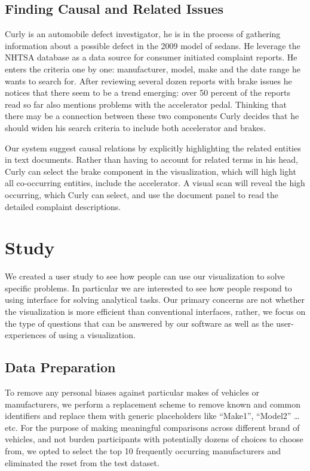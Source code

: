 \subsection{Finding Causal and Related Issues}
Curly is an automobile defect investigator, he is in the process of gathering
information about a possible defect in the 2009 model of sedans. He leverage the
NHTSA database as a data source for consumer initiated complaint reports. He
enters the criteria one by one: manufacturer, model, make and the date range he
wants to search for. After reviewing several dozen reports with brake issues he
notices that there seem to be a trend emerging: over 50 percent of the reports
read so far also mentions problems with the accelerator pedal. Thinking that
there may be a connection between these two components Curly decides that he
should widen his search criteria to include both accelerator and brakes.

Our system suggest causal relations by explicitly highlighting the related
entities in text documents. Rather than having to account for related terms in
his head, Curly can select the brake component in the visualization, which will
high light all co-occurring entities, include the accelerator. A visual scan
will reveal the high occurring, which Curly can select, and use the document
panel to read the detailed complaint descriptions.


\section{Study}
We created a user study to see how people can use our visualization to solve
specific problems. In particular we are interested to see how people respond to
using \threed interface for solving analytical tasks. Our primary concerns are
not whether the visualization is more efficient than conventional interfaces,
rather, we focus on the type of questions that can be answered by our software
as well as the user-experiences of using a \threed visualization.

\subsection{Data Preparation}
To remove any personal biases against particular makes of vehicles or
manufacturers, we perform a replacement scheme to remove known and common
identifiers and replace them with generic placeholders like ``Make1'',
``Model2'' \ldots etc. For the purpose of making meaningful comparisons across
different brand of vehicles, and not burden participants with potentially
dozens of choices to choose from, we opted to select the top 10 frequently
occurring manufacturers and eliminated the reset from the test dataset.


